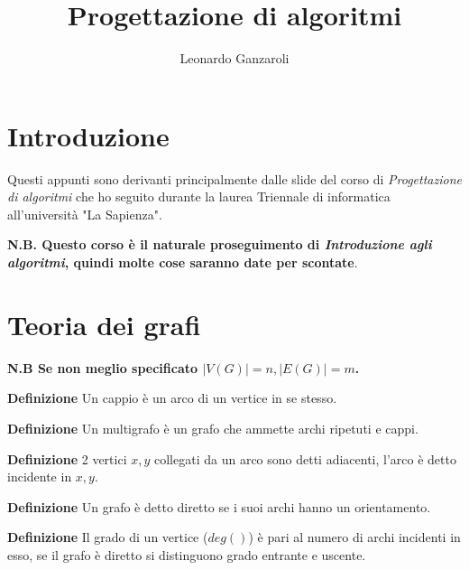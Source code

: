\documentclass{article}
\title{Progettazione di algoritmi}
\author{Leonardo Ganzaroli}
\date{}
\begin{document}
\maketitle


\tableofcontents

\hypersetup{allcolors=black}

\newpage

\section*{Introduzione}

Questi appunti sono derivanti principalmente dalle slide del corso di \textit{Progettazione di algoritmi} che ho seguito durante la laurea Triennale di informatica all'università "La Sapienza".

\noindent \textbf{N.B. Questo corso è il naturale proseguimento di \textit{Introduzione agli algoritmi}, quindi molte cose saranno date per scontate}.

\newpage

\section{Teoria dei grafi}

\textbf{N.B Se non meglio specificato $|V(G)|=n,|E(G)|=m$.}\newline

\noindent\textbf{Definizione} Un cappio è un arco di un vertice in se stesso.\newline

\noindent\textbf{Definizione} Un multigrafo è un grafo che ammette archi ripetuti e cappi.\newline

\noindent\textbf{Definizione} 2 vertici $x,y$ collegati da un arco sono detti adiacenti, l'arco è detto incidente in $x,y$.\newline

\noindent\textbf{Definizione} Un grafo è detto diretto se i suoi archi hanno un orientamento.\newline

\noindent\textbf{Definizione} Il grado di un vertice ($deg()$) è pari al numero di archi incidenti in esso, se il grafo è diretto si distinguono grado entrante e uscente.\newline
\end{document}
